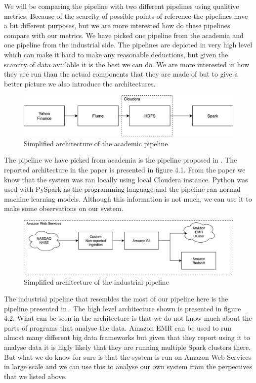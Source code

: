 We will be comparing the pipeline with two different pipelines using qualitive metrics.
Because of the scarcity of possible points of reference the pipelines have a bit different purposes, but we are more interested how do these pipelines compare with our metrics.
We have picked one pipeline from the academia and one pipeline from the industrial side.
The pipelines are depicted in very high level which can make it hard to make any reasonable deductions, but given the scarcity of data available it is the best we can do.
We are more interested in how they are run than the actual components that they are made of but to give a better picture we also introduce the architectures.

\begin{figure}[ht!]
    \includegraphics[scale=0.50]{images/example1} 
    \centering
    \caption{Simplified architecture of the academic pipeline}
\end{figure}

The pipeline we have picked from academia is the pipeline proposed in \cite{peng}.
The reported architecture in the paper is presented in figure 4.1.
From the paper we know that the system was ran locally using local Cloudera instance.
Python was used with PySpark as the programming language and the pipeline ran normal machine learning models.
Although this information is not much, we can use it to make some observations on our system.

\begin{figure}[ht!]
    \includegraphics[scale=0.50]{images/example2} 
    \centering
    \caption{Simplified architecture of the industrial pipeline}
\end{figure}

The industrial pipeline that resembles the most of our pipeline here is the pipeline presented in \cite{snively}.
The high level architecture shown is presented in figure 4.2.
What can be seen in the architecture is that we do not know much about the parts of programs that analyse the data.
Amazon EMR can be used to run almost many different big data frameworks but given that they report using it to analyse data it is higly likely that they are running multiple Spark clusters there.
But what we do know for sure is that the system is run on Amazon Web Services in large scale and we can use this to analyse our own system from the perpectives that we listed above.

